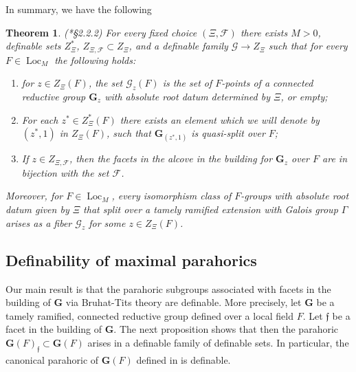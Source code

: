 \documentclass{amsart}
\newcommand{\cF}{\mathcal{F}}
\newcommand{\cG}{\mathcal{G}}
\DeclareMathOperator{\loc}{Loc}
\newcommand{\bG}{\mathbf{G}}
\newcommand{\ff}{{\mathfrak f}}
\theoremstyle{plain}
\newtheorem{theorem}[thm]{Theorem}
\theoremstyle{definition}
\begin{document}
In summary, we have the following
\begin{theorem}\label{thm:def_groups}(\cite{gordon-hales:15a}*{\S 2.2.2})
 For every fixed choice $(\Xi, \cF)$ there exists $M>0$, definable sets $Z_{\Xi}^\ast$,
 $Z_{\Xi, \cF}\subset Z_{\Xi}$,
 and a definable family
 $\cG \to Z_{\Xi}$ such that for every $F\in \loc_M$ %
 the following holds:
 \begin{enumerate}
 \item  for $z\in Z_\Xi(F)$, the set ${\cG_z}(F)$ is the set of $F$-points of a connected reductive group
$\bG_z$ with absolute root datum determined by $\Xi$, or empty;
\item For each $z^\ast\in Z_{\Xi}^\ast(F)$ there exists an element which we will denote by $(z^\ast, 1)$ in $Z_{\Xi}(F)$, such that $\bG_{(z^\ast, 1)}$ is quasi-split over $F$;
\item If $z\in Z_{\Xi, \cF}$, then the facets in the alcove in the building for $\bG_z$ over $F$ are in bijection with the set $\cF$.
\end{enumerate}
Moreover, for $F\in \loc_M$, every isomorphism class of $F$-groups with absolute root datum given by $\Xi$ that split over a tamely ramified extension with Galois group $\Gamma$
arises as a fiber $\cG_z$ for some $z\in Z_\Xi(F)$.
\end{theorem}

\subsection{Definability of maximal parahorics}
Our main result is that the parahoric subgroups associated with facets in the building of $\bG$ via Bruhat-Tits theory are definable.
More precisely, let $\bG$ be a tamely ramified, connected reductive group defined over a local field $F$.
Let $\ff$ be a facet in the building of $\bG$.  The next proposition shows that
then the parahoric $\bG(F)_\ff\subset \bG(F)$ arises in a definable family of definable sets.
In particular, the canonical parahoric of $\bG(F)$ defined in \cite{gross:97a} is definable.
\end{document}
